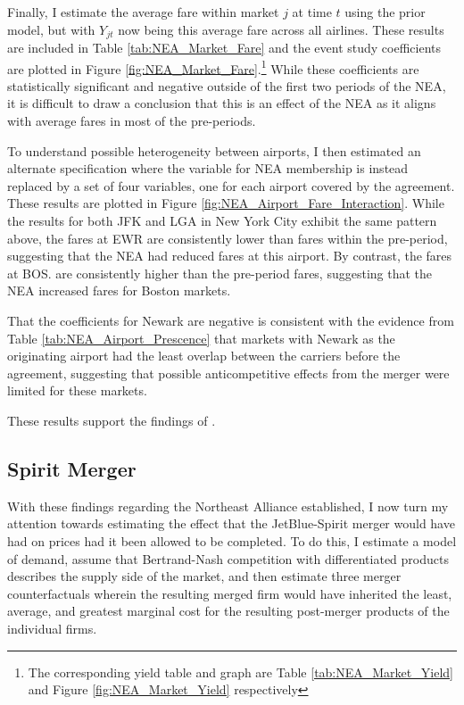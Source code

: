 \documentclass{article}
\begin{document}
	Finally, I estimate the average fare within market $j$ at time $t$ using the prior model, but with $Y_{jt}$ now being this average fare across all airlines.  These results are included in Table \ref{tab:NEA_Market_Fare} and the event study coefficients are plotted in Figure \ref{fig:NEA_Market_Fare}.\footnote{The corresponding yield table and graph are Table \ref{tab:NEA_Market_Yield} and Figure \ref{fig:NEA_Market_Yield} respectively} While these coefficients are statistically significant and negative outside of the first two periods of the NEA, it is difficult to draw a conclusion that this is an effect of the NEA as it aligns with average fares in most of the pre-periods. 
	
	To understand possible heterogeneity between airports, I then estimated an alternate specification where the variable for NEA membership is instead replaced by a set of four variables, one for each airport covered by the agreement. These results are plotted in Figure \ref{fig:NEA_Airport_Fare_Interaction}. While the results for both JFK and LGA in New York City exhibit the same pattern above, the fares at EWR are consistently lower than fares within the pre-period, suggesting that the NEA had reduced fares at this airport. By contrast, the fares at BOS. are consistently higher than the pre-period fares, suggesting that the NEA increased fares for Boston markets.
	
	 That the coefficients for Newark are negative is consistent with the evidence from Table \ref{tab:NEA_Airport_Prescence} that markets with Newark as the originating airport had the least overlap between the carriers before the agreement, suggesting that possible anticompetitive effects from the merger were limited for these markets. 
	
		These results support the findings of \citet{zou_assessing_2023}. 
	

	
	\subsection{Spirit Merger}
	With these findings regarding the Northeast Alliance established, I now turn my attention towards estimating the effect that the JetBlue-Spirit merger would have had on prices had it been allowed to be completed. To do this, I estimate a model of demand, assume that Bertrand-Nash competition with differentiated products describes the supply side of the market, and then estimate three merger counterfactuals wherein the resulting merged firm would have inherited the least, average, and greatest marginal cost for the resulting post-merger products of the individual firms. 
	
\end{document}
